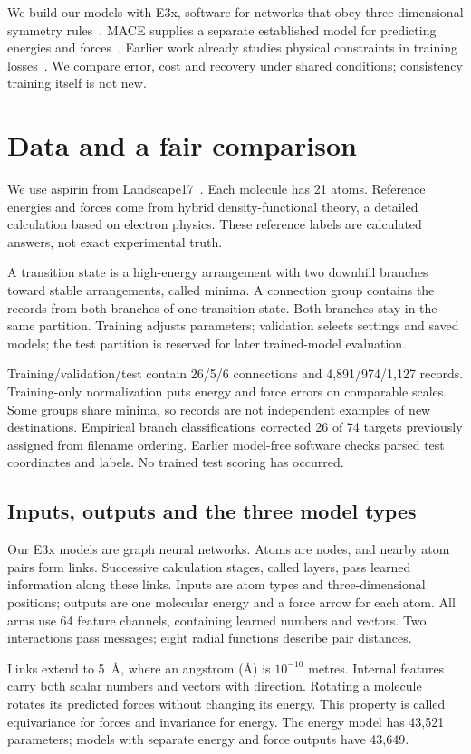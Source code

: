 \documentclass{article}
\begin{document}
We build our models with E3x, software for networks that obey three-dimensional symmetry rules~\cite{e3x}. MACE supplies a separate established model for predicting energies and forces~\cite{mace}. Earlier work already studies physical constraints in training losses~\cite{takamoto}. We compare error, cost and recovery under shared conditions; consistency training itself is not new.

\section{Data and a fair comparison}
We use aspirin from Landscape17~\cite{landscape}. Each molecule has 21 atoms. Reference energies and forces come from hybrid density-functional theory, a detailed calculation based on electron physics. These reference labels are calculated answers, not exact experimental truth.

A transition state is a high-energy arrangement with two downhill branches toward stable arrangements, called minima. A connection group contains the records from both branches of one transition state. Both branches stay in the same partition. Training adjusts parameters; validation selects settings and saved models; the test partition is reserved for later trained-model evaluation.

Training/validation/test contain 26/5/6 connections and 4,891/974/1,127 records. Training-only normalization puts energy and force errors on comparable scales. Some groups share minima, so records are not independent examples of new destinations. Empirical branch classifications corrected 26 of 74 targets previously assigned from filename ordering. Earlier model-free software checks parsed test coordinates and labels. No trained test scoring has occurred.
\subsection{Inputs, outputs and the three model types}
Our E3x models are graph neural networks. Atoms are nodes, and nearby atom pairs form links. Successive calculation stages, called layers, pass learned information along these links. Inputs are atom types and three-dimensional positions; outputs are one molecular energy and a force arrow for each atom. All arms use 64 feature channels, containing learned numbers and vectors. Two interactions pass messages; eight radial functions describe pair distances.

Links extend to 5~\AA, where an angstrom (\AA) is $10^{-10}$ metres. Internal features carry both scalar numbers and vectors with direction. Rotating a molecule rotates its predicted forces without changing its energy. This property is called equivariance for forces and invariance for energy. The energy model has 43,521 parameters; models with separate energy and force outputs have 43,649.
\end{document}
